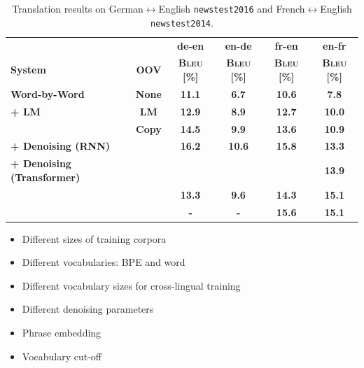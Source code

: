 \documentclass[11pt, a4paper, landscape]{article}
\begin{document}
\begin{table}
	\setcounter{table}{1}
	\caption{Translation results on German$\leftrightarrow$English \texttt{newstest2016} and French$\leftrightarrow$English \texttt{newstest2014}.}
	\centering
	\begin{tabular}{>{\bfseries}l>{\bfseries}c>{\bfseries}c>{\bfseries}c>{\bfseries}c>{\bfseries}c}
		\toprule
		&  & de-en & en-de & fr-en & en-fr\\
		System & OOV  & \textsc{Bleu} [\%] & \textsc{Bleu} [\%] & \textsc{Bleu} [\%] & \textsc{Bleu} [\%]\\
		\midrule
		Word-by-Word & None  & 11.1 & 6.7 & 10.6 & 7.8\\
		\midrule
		+ LM  & LM  & 12.9 & 8.9 & 12.7 & 10.0\\
		&  Copy	& 14.5 & 9.9 & 13.6 & 10.9\\
		\midrule
		\hspace{10pt}+ Denoising (RNN) &  & 16.2 & 10.6 & 15.8 & 13.3 \\
		\hspace{10pt}+ Denoising (Transformer) & & \leavevmode\color{blue}{17.2} & \leavevmode\color{blue}{11.0} & \leavevmode\color{blue}{16.5} & \leavevmode\color{blue}13.9 \\
		\midrule
		\cite{lample2017unsupervised} & & 13.3 & 9.6 & 14.3 & 15.1\\
		\cite{artetxe2017unsupervised} & & - & - & 15.6 & 15.1\\
		\bottomrule
	\end{tabular}
	
	\label{tab:results}
\end{table}	
\vfill	
	\NewPage
	\vfill
	\begin{itemize}
		\item Different sizes of training corpora
		\item Different vocabularies: BPE and word
		\item Different vocabulary sizes for cross-lingual training
		\item Different denoising parameters
		\item Phrase embedding
		\item Vocabulary cut-off
		
	\end{itemize}
	\vfill
	\NewPage
	\vfill
\end{document}
